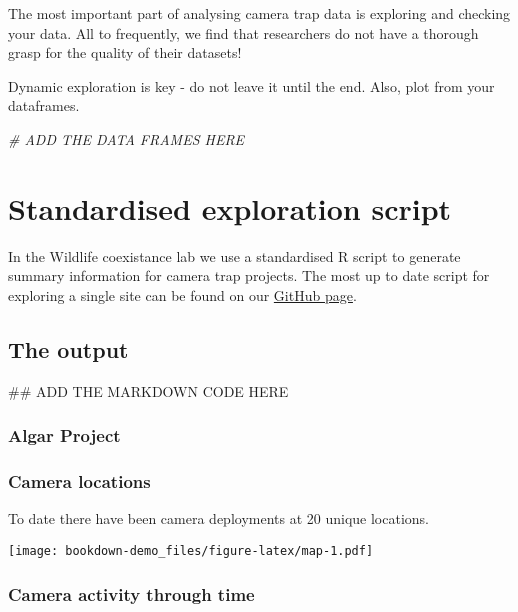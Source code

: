 \documentclass[]{book}
\newenvironment{Shaded}{\begin{snugshade}}{\end{snugshade}}
\newcommand{\CommentTok}[1]{\textcolor[rgb]{0.56,0.35,0.01}{\textit{#1}}}
\newcommand{\NormalTok}[1]{#1}
\begin{document}
The most important part of analysing camera trap data is exploring and
checking your data. All to frequently, we find that researchers do not
have a thorough grasp for the quality of their datasets!

Dynamic exploration is key - do not leave it until the end. Also, plot
from your dataframes.

\begin{Shaded}
\begin{Highlighting}[]
\CommentTok{# ADD THE DATA FRAMES HERE}
\end{Highlighting}
\end{Shaded}

\section{Standardised exploration
script}\label{standardised-exploration-script}

In the Wildlife coexistance lab we use a standardised R script to
generate summary information for camera trap projects. The most up to
date script for exploring a single site can be found on our
\href{https://github.com/WildCoLab/SingleSiteExploration}{GitHub page}.

\subsection{The output}\label{the-output}

\begin{Shaded}
\begin{Highlighting}[]
\NormalTok{## ADD THE MARKDOWN CODE HERE}
\end{Highlighting}
\end{Shaded}

\subsubsection{Algar Project}\label{algar-project}

\subsubsection{Camera locations}\label{camera-locations}

To date there have been camera deployments at 20 unique locations.

\texttt{[image: bookdown-demo\_files/figure-latex/map-1.pdf]}

\subsubsection{Camera activity through
time}\label{camera-activity-through-time}
\end{document}
